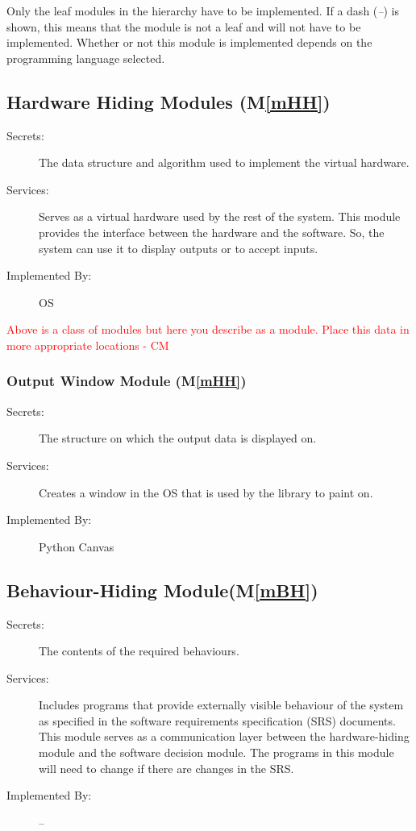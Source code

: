 \documentclass[12pt, titlepage]{article}
\newcommand{\mref}[1]{M\ref{#1}}
\begin{document}
Only the leaf modules in the
hierarchy have to be implemented. If a dash (\emph{--}) is shown, this means
that the module is not a leaf and will not have to be implemented. Whether or
not this module is implemented depends on the programming language
selected.

\subsection{Hardware Hiding Modules (\mref{mHH})}

\begin{description}
\item[Secrets:]The data structure and algorithm used to implement the virtual
  hardware.
\item[Services:]Serves as a virtual hardware used by the rest of the
  system. This module provides the interface between the hardware and the
  software. So, the system can use it to display outputs or to accept inputs.
\item[Implemented By:] OS
\end{description}

\textcolor{red}{Above is a class of modules but here you describe as a module. Place this data in more appropriate locations  - CM} \\

\subsubsection{Output Window Module (\mref{mHH})}

\begin{description}
\item[Secrets:]The structure on which the output data is displayed on.
\item[Services:]Creates a window in the OS that is used by the library to paint on. 
\item[Implemented By:] Python Canvas
\end{description}

\subsection{Behaviour-Hiding Module(\mref{mBH})}

\begin{description}
\item[Secrets:]The contents of the required behaviours.
\item[Services:]Includes programs that provide externally visible behaviour of
  the system as specified in the software requirements specification (SRS)
  documents. This module serves as a communication layer between the
  hardware-hiding module and the software decision module. The programs in this
  module will need to change if there are changes in the SRS.
\item[Implemented By:] --
\end{description}
\end{document}
